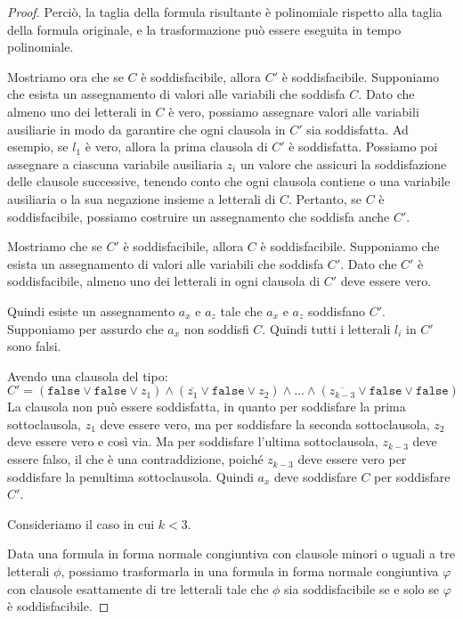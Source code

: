 \begin{proof}
    Perciò, la taglia della formula risultante è polinomiale rispetto alla taglia della
    formula originale, e la trasformazione può essere eseguita in tempo polinomiale.

    Mostriamo ora che se $C$ è soddisfacibile, allora $C'$ è soddisfacibile. Supponiamo
    che esista un assegnamento di valori alle variabili che soddisfa $C$.
    Dato che almeno uno dei letterali in $C$ è vero, possiamo assegnare valori
    alle variabili ausiliarie in modo da garantire che ogni clausola in $C'$ sia
    soddisfatta. Ad esempio, se $l_1$ è vero, allora la prima clausola di $C'$ è
    soddisfatta. Possiamo poi assegnare a ciascuna variabile ausiliaria $z_i$ un
    valore che assicuri la soddisfazione delle clausole successive, tenendo conto
    che ogni clausola contiene o una variabile ausiliaria o la sua negazione insieme
    a letterali di $C$. Pertanto,
    se $C$ è soddisfacibile, possiamo costruire un assegnamento che soddisfa anche $C'$.

    Mostriamo che se $C'$ è soddisfacibile, allora $C$ è soddisfacibile. Supponiamo che
    esista un assegnamento di valori alle variabili che soddisfa $C'$.
    Dato che $C'$ è soddisfacibile, almeno uno dei letterali in ogni clausola di $C'$
    deve essere vero.

    Quindi esiste un assegnamento $a_x$ e $a_z$ tale che $a_x$ e $a_z$ soddisfano $C'$.
    Supponiamo per assurdo che $a_x$ non soddisfi $C$. Quindi tutti i letterali $l_i$
    in $C'$ sono falsi.

    Avendo una clausola del tipo:
    \[
        C' = (\texttt{false} \lor \texttt{false} \lor z_1) 
        \land (\overline{z_1} \lor \texttt{false} \lor z_2) \land \ldots
        \land (\overline{z_{k-3}} \lor \texttt{false} \lor \texttt{false})
    \]
    La clausola non può essere soddisfatta, in quanto per soddisfare la prima 
    sottoclausola, $z_1$ deve essere vero, ma per soddisfare la seconda sottoclausola,
    $z_2$ deve essere vero e così via. Ma per soddisfare l'ultima sottoclausola,
    $z_{k-3}$ deve essere falso, il che è una contraddizione, poiché $z_{k-3}$ deve
    essere vero per soddisfare la penultima sottoclausola.
    Quindi $a_x$ deve soddisfare $C$ per soddisfare $C'$.

    Consideriamo il caso in cui $k < 3$.

    Data una formula in forma normale congiuntiva con clausole minori o uguali a tre
    letterali $\phi$, possiamo trasformarla in una formula in forma normale congiuntiva $\varphi$
    con clausole esattamente di tre letterali tale che $\phi$ sia soddisfacibile se e
    solo se $\varphi$ è soddisfacibile.


\end{proof}

